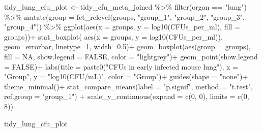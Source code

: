 \documentclass[
]{book}
\newenvironment{Shaded}{\begin{snugshade}}{\end{snugshade}}
\newcommand{\AttributeTok}[1]{\textcolor[rgb]{0.77,0.63,0.00}{#1}}
\newcommand{\ConstantTok}[1]{\textcolor[rgb]{0.00,0.00,0.00}{#1}}
\newcommand{\DecValTok}[1]{\textcolor[rgb]{0.00,0.00,0.81}{#1}}
\newcommand{\FloatTok}[1]{\textcolor[rgb]{0.00,0.00,0.81}{#1}}
\newcommand{\FunctionTok}[1]{\textcolor[rgb]{0.00,0.00,0.00}{#1}}
\newcommand{\NormalTok}[1]{#1}
\newcommand{\OtherTok}[1]{\textcolor[rgb]{0.56,0.35,0.01}{#1}}
\newcommand{\SpecialCharTok}[1]{\textcolor[rgb]{0.00,0.00,0.00}{#1}}
\newcommand{\StringTok}[1]{\textcolor[rgb]{0.31,0.60,0.02}{#1}}
\begin{document}
\begin{Shaded}
\begin{Highlighting}[]
\NormalTok{tidy\_lung\_cfu\_plot }\OtherTok{\textless{}{-}}\NormalTok{ tidy\_cfu\_meta\_joined }\SpecialCharTok{\%\textgreater{}\%}
  \FunctionTok{filter}\NormalTok{(organ }\SpecialCharTok{==} \StringTok{"lung"}\NormalTok{) }\SpecialCharTok{\%\textgreater{}\%}
  \FunctionTok{mutate}\NormalTok{(}\AttributeTok{group =} \FunctionTok{fct\_relevel}\NormalTok{(groups, }\StringTok{"group\_1"}\NormalTok{, }\StringTok{"group\_2"}\NormalTok{, }\StringTok{"group\_3"}\NormalTok{, }\StringTok{"group\_4"}\NormalTok{)) }\SpecialCharTok{\%\textgreater{}\%}
  \FunctionTok{ggplot}\NormalTok{(}\FunctionTok{aes}\NormalTok{(}\AttributeTok{x =}\NormalTok{ groups, }\AttributeTok{y =} \FunctionTok{log10}\NormalTok{(CFUs\_per\_ml), }\AttributeTok{fill =}\NormalTok{ groups))}\SpecialCharTok{+}
  \FunctionTok{stat\_boxplot}\NormalTok{( }\FunctionTok{aes}\NormalTok{(}\AttributeTok{x =}\NormalTok{ groups, }\AttributeTok{y =} \FunctionTok{log10}\NormalTok{(CFUs\_per\_ml)), }
    \AttributeTok{geom=}\StringTok{\textquotesingle{}errorbar\textquotesingle{}}\NormalTok{, }\AttributeTok{linetype=}\DecValTok{1}\NormalTok{, }\AttributeTok{width=}\FloatTok{0.5}\NormalTok{)}\SpecialCharTok{+} 
  \FunctionTok{geom\_boxplot}\NormalTok{(}\FunctionTok{aes}\NormalTok{(}\AttributeTok{group =}\NormalTok{ groups), }\AttributeTok{fill =} \ConstantTok{NA}\NormalTok{, }\AttributeTok{show.legend =} \ConstantTok{FALSE}\NormalTok{, }\AttributeTok{color =} \StringTok{"lightgrey"}\NormalTok{)}\SpecialCharTok{+}
  \FunctionTok{geom\_point}\NormalTok{(}\AttributeTok{show.legend =} \ConstantTok{FALSE}\NormalTok{)}\SpecialCharTok{+}
  \FunctionTok{labs}\NormalTok{(}\AttributeTok{title =} \FunctionTok{paste0}\NormalTok{(}\StringTok{"CFUs in early infected mouse lung"}\NormalTok{), }\AttributeTok{x =} \StringTok{"Group"}\NormalTok{, }\AttributeTok{y =} \StringTok{"log10(CFU/mL)"}\NormalTok{,}
       \AttributeTok{color =} \StringTok{"Group"}\NormalTok{)}\SpecialCharTok{+}
  \FunctionTok{guides}\NormalTok{(}\AttributeTok{shape =} \StringTok{"none"}\NormalTok{)}\SpecialCharTok{+}
  \FunctionTok{theme\_minimal}\NormalTok{()}\SpecialCharTok{+}
  \FunctionTok{stat\_compare\_means}\NormalTok{(}\AttributeTok{label =} \StringTok{"p.signif"}\NormalTok{, }\AttributeTok{method =} \StringTok{"t.test"}\NormalTok{, }\AttributeTok{ref.group =} \StringTok{"group\_1"}\NormalTok{) }\SpecialCharTok{+} 
  \FunctionTok{scale\_y\_continuous}\NormalTok{(}\AttributeTok{expand =} \FunctionTok{c}\NormalTok{(}\DecValTok{0}\NormalTok{, }\DecValTok{0}\NormalTok{), }\AttributeTok{limits =} \FunctionTok{c}\NormalTok{(}\DecValTok{0}\NormalTok{, }\DecValTok{8}\NormalTok{))}

\NormalTok{tidy\_lung\_cfu\_plot}
\end{Highlighting}
\end{Shaded}
\end{document}
